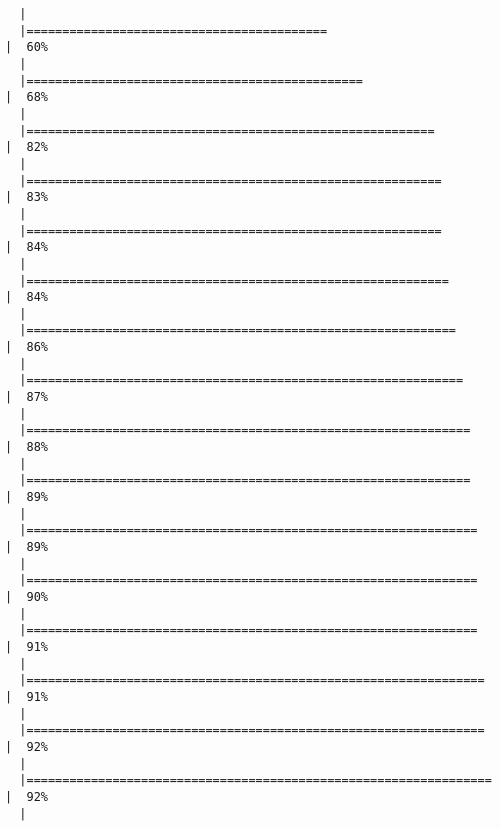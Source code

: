 \documentclass[
  letterpaper,
]{book}
\begin{document}
\begin{verbatim}
  |                                                                            
  |==========================================                            |  60%
  |                                                                            
  |===============================================                       |  68%
  |                                                                            
  |=========================================================             |  82%
  |                                                                            
  |==========================================================            |  83%
  |                                                                            
  |==========================================================            |  84%
  |                                                                            
  |===========================================================           |  84%
  |                                                                            
  |============================================================          |  86%
  |                                                                            
  |=============================================================         |  87%
  |                                                                            
  |==============================================================        |  88%
  |                                                                            
  |==============================================================        |  89%
  |                                                                            
  |===============================================================       |  89%
  |                                                                            
  |===============================================================       |  90%
  |                                                                            
  |===============================================================       |  91%
  |                                                                            
  |================================================================      |  91%
  |                                                                            
  |================================================================      |  92%
  |                                                                            
  |=================================================================     |  92%
  |                                                                            

\end{verbatim}
\end{document}
